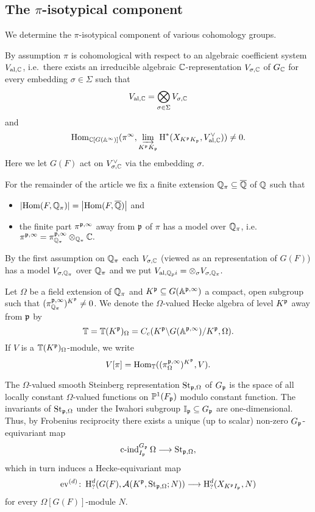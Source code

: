 \subsection{The $\pi$-isotypical component}\label{Component}
We determine the $\pi$-isotypical component of various cohomology groups.

By assumption $\pi$ is cohomological with respect to an algebraic coefficient system $V_{\operatorname{al},\mathbb{C}}$, i.e.~there exists an irreducible algebraic $\mathbb{C}$-representation $V_{\sigma,\mathbb{C}}$ of $G_{\mathbb{C}}$ for every embedding $\sigma\in\Sigma$ such that 
$$V_{\operatorname{al},\mathbb{C}}=\bigotimes_{\sigma\in\Sigma} V_{\sigma,\mathbb{C}}$$
and
$$\operatorname{Hom}_{\mathbb{C}[G(\mathbb{A}^\infty)]}(\pi^{\infty},\varinjlim_{K^{\mathfrak{p}}K_{\mathfrak{p}}} \operatorname{H}^{\ast}(X_{K^{\mathfrak{p}}K_{\mathfrak{p}}},V_{\operatorname{al},\mathbb{C}}^\vee))\neq 0.$$
Here we let $G(F)$ act on $V_{\sigma,\mathbb{C}}^\vee$ via the embedding $\sigma$.

For the remainder of the article we fix a finite extension $\mathbb{Q}_\pi\subseteq\overline{\mathbb{Q}}$ of $\mathbb{Q}$ such that
\begin{itemize}
\item $\left|\operatorname{Hom}(F,\mathbb{Q}_\pi)\right|=\left|\operatorname{Hom}(F,\overline{\mathbb{Q}})\right|$ and
\item the finite part $\pi^{\mathfrak{p},\infty}$ away from $\mathfrak{p}$ of $\pi$ has a model over $\mathbb{Q}_\pi$, i.e.~$\pi^{\mathfrak{p},\infty}=\pi^{\mathfrak{p},\infty}_{\mathbb{Q}_\pi}\otimes_{\mathbb{Q}_\pi}\mathbb{C}.$
\end{itemize}
By the first assumption on $\mathbb{Q}_\pi$ each $V_{\sigma,\mathbb{C}}$ (viewed as an representation of $G(F)$) has a model $V_{\sigma,\mathbb{Q}_\pi}$ over $\mathbb{Q}_\pi$ and we put $V_{\operatorname{al},\mathbb{Q}_pi}=\otimes_{\sigma}V_{\sigma,\mathbb{Q}_\pi}.$

Let $\Omega$ be a field extension of $\mathbb{Q}_\pi$ and $K^{\mathfrak{p}}\subseteq G(\mathbb{A}^{\mathfrak{p},\infty})$ a compact, open subgroup such that $(\pi^{\mathfrak{p},\infty}_{\mathbb{Q}_\pi})^{K^{\mathfrak{p}}}\neq 0$.
We denote the $\Omega$-valued Hecke algebra of level $K^{\mathfrak{p}}$ away from $\mathfrak{p}$ by
$$\mathbb{\mathbb{T}}=\mathbb{T}(K^{\mathfrak{p}})_\Omega=C_c(K^{\mathfrak{p}}\backslash G(\mathbb{A}^{\mathfrak{p},\infty})/K^{\mathfrak{p}},\Omega).$$
If $V$ is a $\mathbb{T}(K^{\mathfrak{p}})_\Omega$-module, we write
$$V[\pi]=\operatorname{Hom}_{\mathbb{T}}((\pi^{\mathfrak{p},\infty}_\Omega)^{K^{\mathfrak{p}}},V).$$

The $\Omega$-valued smooth Steinberg representation $\operatorname{St}_{\mathfrak{p},\Omega}$ of $G_{\mathfrak{p}}$ is the space of all locally constant $\Omega$-valued functions on $\mathbb{P}^1(F_{\mathfrak{p}})$ modulo constant function.
The invariants of $\operatorname{St}_{\mathfrak{p},\Omega}$ under the Iwahori subgroup $\mathbb{I}_{\mathfrak{p}}\subseteq G_{\mathfrak{p}}$ are one-dimensional.
Thus, by Frobenius reciprocity there exists a unique (up to scalar) non-zero $G_{\mathfrak{p}}$-equivariant map
$$\operatorname{c-ind}_{I_{\mathfrak{p}}}^{G_{\mathfrak{p}}}\Omega \longrightarrow \operatorname{St}_{\mathfrak{p},\Omega},$$
which in turn induces a Hecke-equivariant map
\begin{align}\label{evaluation}
\operatorname{ev}^{(d)}\colon \operatorname{H}^{d}_?(G(F),\mathcal{A}(K^{\mathfrak{p}},\operatorname{St}_{\mathfrak{p},\Omega};N))\longrightarrow \operatorname{H}^{d}_?(X_{K^{\mathfrak{p}} I_{\mathfrak{p}}},N)
\end{align}
for every $\Omega[G(F)]$-module $N$.


